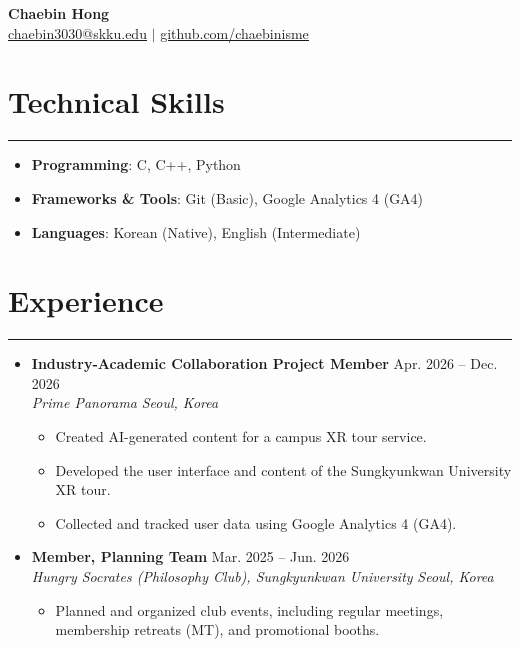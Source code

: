 \documentclass[letterpaper, 10pt]{article}
\begin{document}
\begin{center}
\textbf{\LARGE Chaebin Hong} \\ \vspace{2pt}
\href{mailto:chaebin3030@skku.edu}{\underline{chaebin3030@skku.edu}} $|$
\href{https://github.com/chaebinisme}{\underline{github.com/chaebinisme}}
\end{center}
\section*{Technical Skills}
\hrule
\vspace{4pt}
\begin{itemize}
\item[] \textbf{Programming}: C, C++, Python
\item[] \textbf{Frameworks \& Tools}: Git (Basic), Google Analytics 4 (GA4)
\item[] \textbf{Languages}: Korean (Native), English (Intermediate)
\end{itemize}
\section*{Experience}
\hrule
\vspace{4pt}
\begin{itemize}
\item[]
\textbf{Industry-Academic Collaboration Project Member} \hfill Apr. 2026 -- Dec. 2026 \\
\textit{Prime Panorama} \hfill \textit{Seoul, Korea}
\begin{itemize}
\item Created AI-generated content for a campus XR tour service.
\item Developed the user interface and content of the Sungkyunkwan University XR tour.
\item Collected and tracked user data using Google Analytics 4 (GA4).
\end{itemize}
\item[]
\textbf{Member, Planning Team} \hfill Mar. 2025 -- Jun. 2026 \\
\textit{Hungry Socrates (Philosophy Club), Sungkyunkwan University} \hfill \textit{Seoul, Korea}
\begin{itemize}
\item Planned and organized club events, including regular meetings, membership retreats (MT), and promotional booths.
\end{itemize}
\end{itemize}
\end{document}
